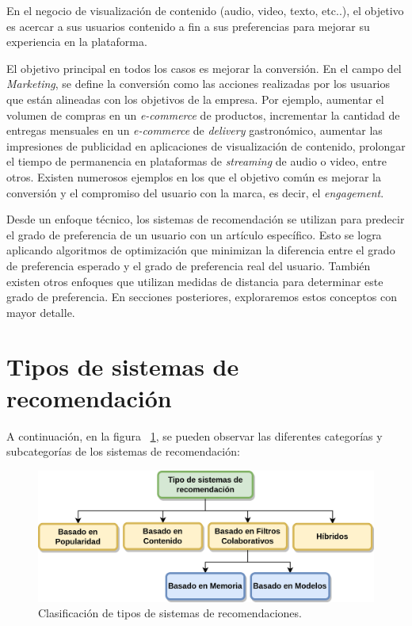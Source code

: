 \documentclass[11pt,a4paper,twoside]{thesis}
\begin{document}
En el negocio de visualización de contenido (audio, video, texto, etc..), el
objetivo es acercar a sus usuarios contenido a fin a sus preferencias para
mejorar su experiencia en la plataforma.

El objetivo principal en todos los casos es mejorar la conversión. En el campo
del \textit{Marketing}, se define la conversión como las acciones realizadas
por los usuarios que están alineadas con los objetivos de la empresa. Por
ejemplo, aumentar el volumen de compras en un \textit{e-commerce} de productos,
incrementar la cantidad de entregas mensuales en un \textit{e-commerce} de
\textit{delivery} gastronómico, aumentar las impresiones de publicidad en
aplicaciones de visualización de contenido, prolongar el tiempo de permanencia
en plataformas de \textit{streaming} de audio o video, entre otros. Existen
numerosos ejemplos en los que el objetivo común es mejorar la conversión y el
compromiso del usuario con la marca, es decir, el \textit{engagement}.

Desde un enfoque técnico, los sistemas de recomendación se utilizan para
predecir el grado de preferencia de un usuario con un artículo específico. Esto
se logra aplicando algoritmos de optimización que minimizan la diferencia entre
el grado de preferencia esperado y el grado de preferencia real del usuario.
También existen otros enfoques que utilizan medidas de distancia para
determinar este grado de preferencia. En secciones posteriores, exploraremos
estos conceptos con mayor detalle.

\clearpage
\section{Tipos de sistemas de recomendación}

A continuación, en la figura ~\ref{fig:clasification}, se pueden observar las
diferentes categorías y subcategorías de los sistemas de recomendación:

\begin{figure}[!htb]
	\centering
	\includegraphics[width=12cm]{./images/clasificacion-sis-rec.png}
	\caption{Clasificación de tipos de sistemas de recomendaciones.}
	\label{fig:clasification}
\end{figure}
\end{document}

